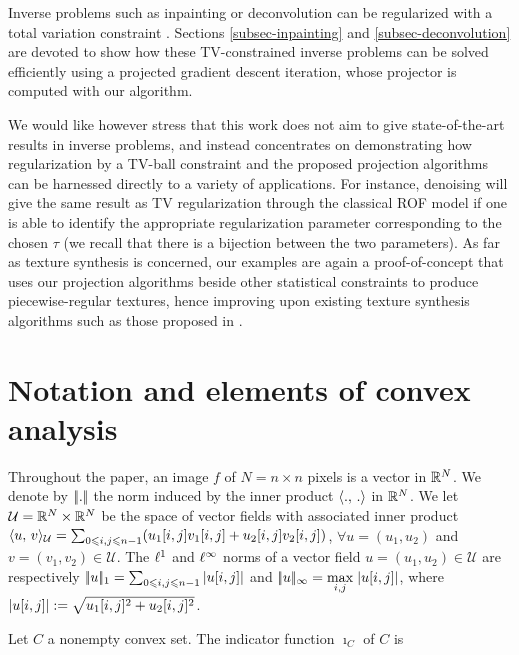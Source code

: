 \documentclass[11pt,nofonttune,a4paper]{IEEEtran}
\newcommand{\Um}{\mathcal{U}}
\begin{document}
Inverse problems such as inpainting or deconvolution can be regularized with a total variation constraint \cite{combettes-pesquer-tv}. Sections \ref{subsec-inpainting} and \ref{subsec-deconvolution} are devoted to show how these TV-constrained inverse problems can be solved efficiently using a projected gradient descent iteration, whose projector is computed with our algorithm. 

We would like however stress that this work does not aim to give state-of-the-art results in inverse problems, and instead concentrates on demonstrating how regularization by a TV-ball constraint and the proposed projection algorithms can be harnessed directly to a variety of applications. For instance, denoising will give the same result as TV regularization through the classical ROF model if one is able to identify the appropriate regularization parameter corresponding to the chosen $\tau$ (we recall that there is a bijection between the two parameters). As far as texture synthesis is concerned, our examples are again a proof-of-concept that uses our projection algorithms beside other statistical constraints to produce piecewise-regular textures, hence improving upon existing texture synthesis algorithms such as those proposed in \cite{portilla-parametric-model}.



\section{Notation and elements of convex analysis}
\label{sec:notation}
Throughout the paper, an image $f$ of $N = n \times n$ pixels is a vector in $\mathbb{R}^N$. We
denote by $|\!| . |\!|$ the norm induced by the inner product $\langle .,\,.\rangle$ in $\mathbb{R}^N$.
We let $\Um = \RR^{N} \times \RR^{N}$ be the space of vector fields with associated inner product $\dotp{u}{v}_\Um = \sum_{0 \leq i,j \leq n-1} (u_1[i,j]v_1[i,j]+u_2[i,j]v_2[i,j])$, $\forall u=(u_1,u_2)$ and $v=(v_1,v_2) \in \Um$. The $\ell^1$ and $\ell^\infty$ norms of a vector field $u=(u_1,u_2) \in \Um$ are respectively $|\!| u |\!|_{1} = \sum_{0 \leqslant i,j \leqslant n-1} | u[i,j] |$ and $|\!| u |\!|_{\infty} = \underset{i,j}{\max}\; | u[i,j] |$, where $| u[i,j] |:=\sqrt{ u_1[i,j]^2 + u_2[i,j]^2 }$.

Let $C$ a nonempty convex set. The indicator function $\imath_{C}$ of $C$ is 
\end{document}
